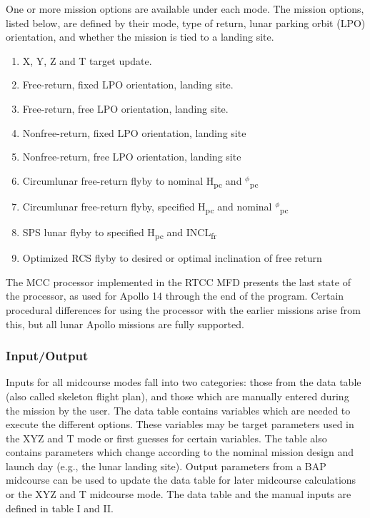 \documentclass[11pt]{article} %
\begin{document}
One or more mission options are available under each mode. The mission options, listed below, are defined by their mode, type of return, lunar parking orbit (LPO) orientation, and whether the mission is tied to a landing site.

\begin{enumerate}
	\item X, Y, Z and T target update.
	\item Free-return, fixed LPO orientation, landing site.
	\item Free-return, free LPO orientation, landing site.
	\item	Nonfree-return, fixed LPO orientation, landing site
	\item	Nonfree-return, free LPO orientation, landing site
	\item	Circumlunar free-return flyby to nominal H\textsubscript{pc} and $^{\phi}$\textsubscript{pc}
	\item	Circumlunar free-return flyby, specified H\textsubscript{pc} and nominal $^{\phi}$\textsubscript{pc}
	\item	SPS lunar flyby to specified H\textsubscript{pc} and INCL\textsubscript{fr}
	\item	Optimized RCS flyby to desired or optimal inclination of free return
\end{enumerate}

The MCC processor implemented in the RTCC MFD presents the last state of the processor, as used for Apollo 14 through the end of the program. Certain procedural differences for using the processor with the earlier missions arise from this, but all lunar Apollo missions are fully supported.

\subsubsection{Input/Output}

Inputs for all midcourse modes fall into two categories: those from the data table (also called skeleton flight plan), and those which are manually entered during the mission by the user. The data table contains variables which are needed to execute the different options. These variables may be target parameters used in the XYZ and T mode or first guesses for certain variables. The table also contains parameters which change according to the nominal mission design and launch day (e.g., the lunar landing site). Output parameters from a BAP midcourse can be used to update the data table for later midcourse calculations or the XYZ and T midcourse mode. The data table and the manual inputs are defined in table I and II.\\
\end{document}
